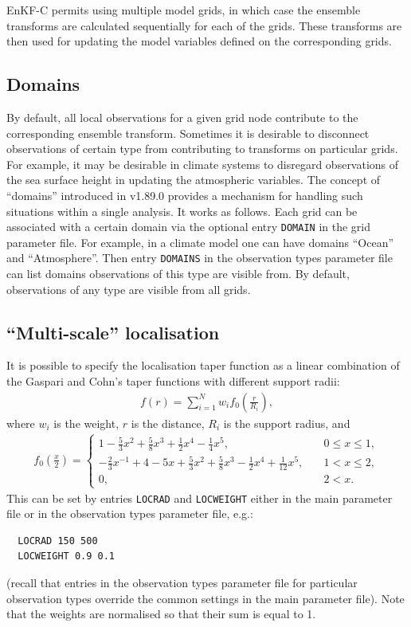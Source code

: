 \documentclass[11pt]{report}
\begin{document}
EnKF-C permits using multiple model grids, in which case the ensemble transforms are calculated sequentially for each of the grids.
These transforms are then used for updating the model variables defined on the corresponding grids.

\subsection{Domains}
\label{sec:domains}

By default, all local observations for a given grid node contribute to the corresponding ensemble transform.
Sometimes it is desirable to disconnect observations of certain type from contributing to transforms on particular grids.
For example, it may be desirable in climate systems to disregard observations of the sea surface height in updating the atmospheric variables.
The concept of ``domains'' introduced in v1.89.0 provides a mechanism for handling such situations within a single analysis.
It works as follows.
Each grid can be associated with a certain domain via the optional entry \verb|DOMAIN| in the grid parameter file.
For example, in a climate model one can have domains ``Ocean'' and ``Atmosphere''.
Then entry \verb|DOMAINS| in the observation types parameter file can list domains observations of this type are visible from.
By default, observations of any type are visible from all grids.

\subsection {``Multi-scale'' localisation}

It is possible to specify the localisation taper function as a linear combination of the Gaspari and Cohn's taper functions with different support radii:
\begin{align*}
  f(r) = \sum_{i=1}^N w_i f_0(\frac{r}{R_i}),
\end{align*}
where $w_i$ is the weight, $r$ is the distance, $R_i$ is the support radius, and
\begin{align*}
  f_0(\frac{x}{2}) = \left\{
  \begin{array}{ll}
    1 - \frac{5}{3} x^2 + \frac{5}{8} x^3 + \frac{1}{2} x^4 -\frac{1}{4} x^5, \quad & 0 \le x \le 1,\\
    -\frac{2}{3} x^{-1} + 4 - 5x + \frac{5}{3}x^2 + \frac{5}{8}x^3 - \frac{1}{2} x^4 + \frac{1}{12}x^5, \quad & 1 < x \le 2,\\
    0, \quad & 2 < x.
  \end{array}
  \right.
\end{align*}
This can be set by entries \verb|LOCRAD| and \verb|LOCWEIGHT| either in the main parameter file or in the observation types parameter file, e.g.:
\begin{Verbatim}
  LOCRAD 150 500
  LOCWEIGHT 0.9 0.1
\end{Verbatim}
(recall that entries in the observation types parameter file for particular observation types override the common settings in the main parameter file).
Note that the weights are normalised so that their sum is equal to 1.
\end{document}
